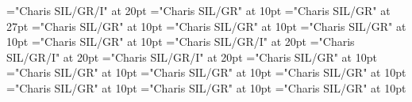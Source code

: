 \documentclass[a4paper]{article}
\begin{document}
\pagestyle{plain}
\sloppy
\setlength{\parfillskip}{0pt plus 1fil}
\font\pronunciationenUKpronunciationbefore="Charis SIL/GR/I" at 20pt
\font\sectionletterdictionary="Charis SIL/GR" at 10pt
\font\headsectionletterdictionary="Charis SIL/GR" at 27pt
\font\articledictionary="Charis SIL/GR" at 10pt
\font\firstoftypeheadwordlastoftypearticledictionary="Charis SIL/GR" at 10pt
\font\firstoftypegrammarrequireslastoftypearticledictionary="Charis SIL/GR" at 10pt
\font\firstoftypelastoftyperelationsynonymarticledictionary="Charis SIL/GR" at 10pt
\font\firstoftypepronunciationenUKarticledictionary="Charis SIL/GR/I" at 20pt
\font\lastoftypepronunciationenUSarticledictionary="Charis SIL/GR/I" at 20pt
\font\lastoftypepronunciationenUKarticledictionary="Charis SIL/GR/I" at 20pt
\font\firstoftypegrammarcategorylastoftypearticledictionary="Charis SIL/GR" at 10pt
\font{}="Charis SIL/GR" at 10pt
\font\firstoftypelastoftypenotearticledictionary="Charis SIL/GR" at 10pt
\font\exampleusefirstoftypearticledictionary="Charis SIL/GR" at 10pt
\font\examplefirstoftypearticledictionary="Charis SIL/GR" at 10pt
\font\exampleuselastoftypearticledictionary="Charis SIL/GR" at 10pt
\font\examplelastoftypearticledictionary="Charis SIL/GR" at 10pt

\mbox{} 
\newpage 
\newpage 
\setcounter{page}{1} 
\pagestyle{fancy} 
\begin{center}
\end{center}

\lastoftypepronunciationenUSarticledictionary{, }
\end{document}
